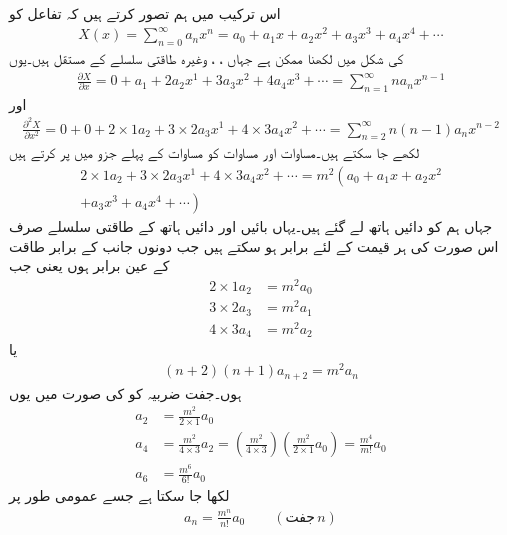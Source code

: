 اس ترکیب میں ہم تصور کرتے ہیں کہ  تفاعل کو 
\begin{align}\label{مساوات_لاپلاس_طاقتی_سلسلہ_الف}
X(x)=\sum_{n=0}^{\infty} a_n x^n=a_0 +a_1x+a_2 x^2+a_3 x^3+a_4 x^4+\cdots
\end{align}
کی شکل میں لکھنا ممکن ہے جہاں ، ،  وغیرہ طاقتی سلسلے کے مستقل ہیں۔یوں 
\begin{align*}
\frac{\partial X}{\partial x}=0 +a_1+2 a_2 x^1+3a_3 x^2+4a_4 x^3+\cdots=\sum_{n=1}^{\infty} n a_n x^{n-1}
\end{align*}
اور
\begin{align}\label{مساوات_لاپلاس_طاقتی_سلسلہ_ب}
\frac{\partial^2 X}{\partial x^2}=0 +0+2 \times 1  a_2+3 \times 2 a_3 x^1+4 \times 3 a_4 x^2+\cdots=\sum_{n=2}^{\infty} n(n-1) a_n x^{n-2}
\end{align}
لکھے جا سکتے ہیں۔مساوات  اور مساوات  کو مساوات  کے پہلے جزو میں پر کرتے ہیں
\begin{multline*}
 2 \times 1  a_2+3 \times 2 a_3 x^1+4 \times 3 a_4 x^2+\cdots =m^2 \left(a_0 +a_1x+a_2 x^2 \right.\\\left. +a_3 x^3+a_4 x^4+\cdots \right)
\end{multline*}  
جہاں ہم  کو دائیں ہاتھ لے گئے ہیں۔یہاں بائیں اور دائیں ہاتھ کے طاقتی سلسلے صرف اس صورت  کی ہر قیمت کے لئے برابر ہو سکتے ہیں جب دونوں جانب   کے برابر طاقت کے  عین برابر ہوں یعنی جب
\begin{align*}
2 \times 1  a_2&=m^2 a_0\\
3 \times 2 a_3&=m^2 a_1\\
4 \times 3 a_4&=m^2 a_2
\end{align*}
یا
\begin{align*}
(n+2)(n+1)a_{n+2}=m^2 a_n
\end{align*}
ہوں۔جفت ضربیہ کو  کی صورت میں یوں
\begin{align*}
a_2&=\frac{m^2 }{2 \times 1} a_0\\
a_4&=\frac{m^2 }{4 \times 3} a_2=\left(\frac{m^2 }{4 \times 3}\right)\left(\frac{m^2 }{2 \times 1} a_0\right)=\frac{m^4}{m!}a_0\\
a_6&=\frac{m^6}{6!}a_0
\end{align*}
 لکھا جا سکتا ہے جسے عمومی طور پر
\begin{align*}
a_n=\frac{m^{n}}{n!}a_0 \quad \quad (\textrm{جفت}\, n)
\end{align*}
